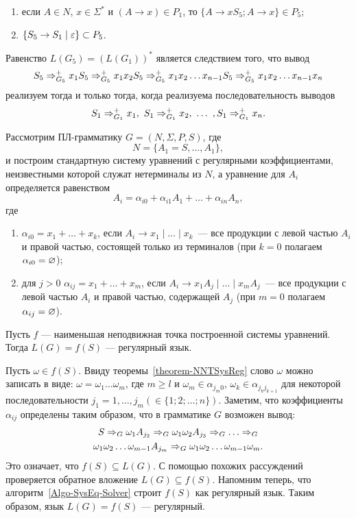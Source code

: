 \begin{myproof}
\begin{enumerate}
\begin{enumerate}[label=(\emph{\roman*})]
	\item если $A\in N$, $x\in\Sigma^*$ и $(A\to x)\in P_1$, то $\{A\to xS_5;A\to x\}\in P_5$;

	\item $\{S_5\to S_1\mid\varepsilon\}\subset P_5$.
\end{enumerate}
Равенство $L(G_5)=(L(G_1))^*$ является следствием того, что вывод
\[
S_5 \Rightarrow_{G_5}^+ x_1S_5 \Rightarrow_{G_5}^+ x_1x_2S_5 \Rightarrow_{G_5}^+ x_1x_2\ldots x_{n-1}S_5 \Rightarrow_{G_5}^+ x_1x_2\ldots x_{n-1}x_n
\]
реализуем тогда и только тогда, когда реализуема последовательность выводов
\[
S_1 \Rightarrow_{G_1}^+ x_1,~ S_1 \Rightarrow_{G_1}^+x_2,~\ldots ~, S_1 \Rightarrow_{G_1}^+ x_n.
\]
\end{enumerate}
\end{myproof}

\begin{mylemma}
\label{lemma-PL-reg-lang}
Рассмотрим ПЛ-грамматику $G=(N,\Sigma,P,S)$, где
\[
    N=\{A_1=S,\ldots ,A_1\},
\]
и построим стандартную систему уравнений с регулярными коэффициентами, неизвестными которой служат нетерминалы из $N$, а уравнение для $A_i$ определяется равенством
\[
A_i=\alpha_{i0}+\alpha_{i1}A_1+ \ldots +\alpha_{in}A_n,
\]
где
\begin{enumerate}
    \item $\alpha_{i0} = x_1 + \ldots + x_k$, если $A_i \to x_1 \mid \ldots
    \mid x_k$~--- все продукции с левой частью $A_i$ и правой частью,
    состоящей только из терминалов (при $k=0$ полагаем
    $\alpha_{i0}=\varnothing$);

    \item для $j>0$ $\alpha_{ij} = x_1 + \ldots + x_m$, если
    $A_i \to x_1A_j \mid \ldots  \mid x_mA_j$~--- все продукции с
    левой частью $A_i$ и правой частью, содержащей $A_j$
    (при $m=0$ полагаем $\alpha_{ij}=\varnothing$).
\end{enumerate}

Пусть $f$ --- наименьшая неподвижная точка построенной системы уравнений. Тогда $L(G)=f(S)$ --- регулярный язык.
\end{mylemma}

\begin{myproof}
Пусть $\omega\in f(S)$. Ввиду теоремы~\ref{theorem-NNTSysReg} слово $\omega$ можно записать в виде: $\omega=\omega_1\ldots \omega_m$, где $m\ge l$ и $\omega_m\in\alpha_{j_m0}$, $\omega_k\in\alpha_{j_kj_{k+1}}$ для некоторой последовательности $j_1=1, \ldots , j_m (\in\{1;2;\ldots ;n\})$. Заметим, что коэффициенты $\alpha_{ij}$ определены таким образом, что в грамматике $G$ возможен вывод:
\begin{multline}
    S \Rightarrow_G 
    \omega_1A_{j_2} \Rightarrow_G 
    \omega_1\omega_2A_{j_3} \Rightarrow_G 
    \ldots \Rightarrow_G \\
    \omega_1\omega_2\ldots \omega_{m-1}A_{j_m} \Rightarrow_G 
    \omega_1\omega_2\ldots \omega_{m-1}\omega_m.
\end{multline}
Это означает, что $f(S)\subseteq L(G)$. С помощью похожих рассуждений проверяется обратное вложение $L(G)\subseteq f(S)$. Напомним теперь, что алгоритм~\ref{Algo-SysEq-Solver} строит $f(S)$ как регулярный язык. Таким образом, язык $L(G)=f(S)$ --- регулярный.
\end{myproof}

